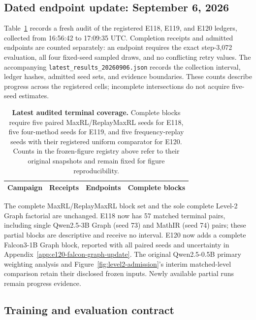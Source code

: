 \documentclass{article}
\newcommand{\1}{\mathbf 1}
\theoremstyle{remark}
\theoremstyle{definition}
\theoremstyle{plain}
\begin{document}
\subsection{Dated endpoint update: September 6, 2026}
\label{app:latest-results-update}

Table~\ref{tab:latest-results-update} records a fresh audit of the registered
E118, E119, and E120 ledgers, collected from 16:56:42 to 17:09:35 UTC.
Completion receipts and admitted endpoints are counted separately: an endpoint requires the exact step-3,072 evaluation,
all four fixed-seed sampled draws, and no conflicting retry values. The
accompanying \texttt{latest\_results\_20260906.json} records the collection
interval, ledger hashes, admitted seed sets, and evidence boundaries.
These counts describe progress across the registered cells; incomplete
intersections do not acquire five-seed estimates.

\begin{table}[H]
  \centering
  \caption{\textbf{Latest audited terminal coverage.}
  Complete blocks require five paired MaxRL/ReplayMaxRL seeds for E118,
  five four-method seeds for E119, and five frequency-replay seeds with
  their registered uniform comparator for E120. Counts in the frozen-figure
  registry above refer to their original snapshots and remain fixed for figure reproducibility.}
  \label{tab:latest-results-update}
  \small
  \setlength{\tabcolsep}{5pt}
  \begin{tabular}{@{}lrrr@{}}
    \toprule
    \textbf{Campaign} & \textbf{Receipts} & \textbf{Endpoints}
      & \textbf{Complete blocks} \\
    \midrule
    
  \end{tabular}
\end{table}

The complete MaxRL/ReplayMaxRL block set and the sole complete Level-2
Graph factorial are unchanged. E118 now has 57 matched terminal pairs,
including single Qwen2.5-3B Graph (seed 73) and MathIR (seed 74) pairs;
these partial blocks are descriptive and receive no interval. E120 now adds a complete Falcon3-1B Graph
block, reported with all paired seeds and uncertainty in
Appendix~\ref{app:e120-falcon-graph-update}. The original Qwen2.5-0.5B
primary weighting analysis and Figure~\ref{fig:level2-admission}'s interim
matched-level comparison retain their disclosed frozen inputs. Newly
available partial runs remain progress evidence.

\subsection{Training and evaluation contract}
\label{app:repro-run-contract}
\end{document}
